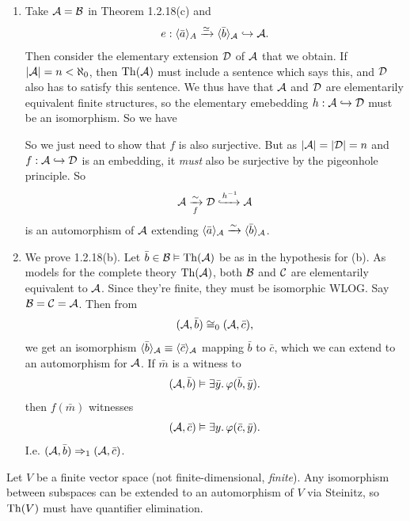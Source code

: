 \documentclass{article}
\numberwithin{thm}{subsection}
\begin{document}
\proof \hspace{0.1cm} \begin{enumerate}
    \item[$(\Rightarrow)$] Take $\mathcal{A} = \mathcal{B}$ in Theorem 1.2.18(c) and \[e: \langle \bar a \rangle_{A} \xrightarrow{\simeq} \langle \bar b \rangle_{\mathcal{A}} \hookrightarrow \mathcal{A}. \] Then consider the elementary extension $\mathcal{D}$ of $\mathcal{A}$ that we obtain. \gap If $|\mathcal{A}|=n<\aleph_{0}$, then $\operatorname{Th}(\mathcal{A})$ must include a sentence which says this, and $\mathcal{D}$ also has to satisfy this sentence. We thus have that $\mathcal{A}$ and $\mathcal{D}$ are elementarily equivalent finite structures, so the elementary emebedding $h: \mathcal{A} \hookrightarrow \mathcal{D}$ must be an isomorphism. So we have \begin{center}
    \end{center}
    So we just need to show that $f$ is also surjective. But as $|\mathcal{A}| = |\mathcal{D}| = n$ and $f: \mathcal{A} \hookrightarrow \mathcal{D}$ is an embedding, it \textit{must} also be surjective by the pigeonhole principle. So \[\mathcal{A} \xrightarrow[f]{\sim} \mathcal{D} \xhookrightarrow{h^{-1}} \mathcal{A}\] is an automorphism of $\mathcal{A}$ extending $\langle \bar a \rangle_{\mathcal{A}} \xrightarrow{\sim} \langle \bar b \rangle_{\mathcal{A}}$.
    \item[$(\Leftarrow)$] We prove 1.2.18(b). Let $\bar b \in \mathcal{B} \vDash \operatorname{Th}(\mathcal{A})$ be as in the hypothesis for (b). As models for the complete theory $\operatorname{Th}(\mathcal{A})$, both $\mathcal{B}$ and $\mathcal{C}$ are elementarily equivalent to $\mathcal{A}$. Since they're finite, they must be isomorphic WLOG. Say $\mathcal{B} = \mathcal{C} = \mathcal{A}$. Then from \[ (\mathcal{A}, \bar b) \cong_{0} (\mathcal{A}, \bar c),\] we get an isomorphism $\langle \bar b \rangle_{\mathcal{A}} \equiv \langle \bar c \rangle_{\mathcal{A}}$ mapping $\bar b$ to $\bar c$, which we can extend to an automorphism for $\mathcal{A}$. If $\bar m$ is a witness to \[ (\mathcal{A}, \bar b) \vDash \exists \bar y. \, \varphi(\bar b, \bar y).\] then $f(\bar m)$ witnesses \[ (\mathcal{A}, \bar c) \vDash \exists y. \, \varphi(\bar c, \bar y).\] I.e. $(\mathcal{A}, \bar b) \Rightarrow_{1} (\mathcal{A}, \bar c)$.

\end{enumerate}
\endproof
\begin{ex}
    Let $V$ be a finite vector space (not finite-dimensional, \textit{finite}). Any isomorphism between subspaces can be extended to an automorphism of $V$ via Steinitz, so $\operatorname{Th}(V)$ must have quantifier elimination.
\end{ex}
\end{document}
